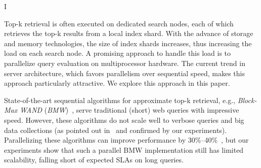 

I




Top-k retrieval is often executed on dedicated search nodes, each of which retrieves the top-k results from a local index shard. 
With the advance of storage and memory technologies, the size of index shards increases, thus increasing the load on each search node. 
A promising approach to handle this load is to  parallelize query evaluation on multiprocessor hardware. 
The current trend in server architecture, which favors parallelism over sequential speed, makes this approach particularly attractive. 
We explore this approach in this paper.





State-of-the-art sequential algorithms for approximate top-k  retrieval, 
e.g., \emph{Block-Max WAND} ({\em BMW})~\cite{Ding:2011}, serve traditional (short) web queries with impressive speed. 
However, these algorithms do not scale well to verbose queries
and big data collections 
(as pointed out in~\cite{Bortnikov:2017} and confirmed by our experiments). 
%
Parallelizing these algorithms can improve performance by 30\%--40\%~\cite{rojas2013efficient},    but 
our experiments show that such a parallel BMW implementation still has limited scalability, falling short of expected SLAs on long queries. 


